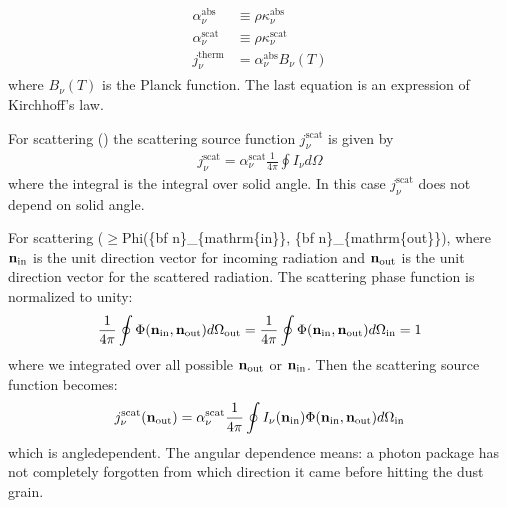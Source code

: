 \documentclass[letterpaper,10pt,english]{sphinxmanual}
\begin{document}
\label{\detokenize{dustradtrans:eq-thermal-source-function}}\begin{equation*}
\begin{split}\begin{split}
\alpha_\nu^{\mathrm{abs}} &\equiv \rho\kappa_\nu^{\mathrm{abs}}\\
\alpha_\nu^{\mathrm{scat}} &\equiv \rho\kappa_\nu^{\mathrm{scat}}\\
j_\nu^{\mathrm{therm}} &= \alpha_\nu^{\mathrm{abs}} B_\nu(T)
\end{split}\end{split}
\end{equation*}
where \(B_\nu(T)\) is the Planck function. The last equation is an
expression of Kirchhoff’s law.

For  scattering () the
scattering source function \(j_\nu^{\mathrm{scat}}\) is given by
\begin{equation*}
\begin{split}j_\nu^{\mathrm{scat}} = \alpha_\nu^{\mathrm{scat}} \frac{1}{4\pi}\oint I_\nu d\Omega\end{split}
\end{equation*}
where the integral is the integral over solid angle. In this case
\(j_\nu^{\mathrm{scat}}\) does not depend on solid angle.

For  scattering (\(\ge\)Phi(\{bf n\}\_\{mathrm\{in\}\},
\{bf n\}\_\{mathrm\{out\}\})\textasciigrave{}, where
\({\bf n}_{\mathrm{in}}\) is the unit direction vector for incoming radiation
and \({\bf n}_{\mathrm{out}}\) is the unit direction vector for the scattered
radiation. The
scattering phase function is normalized to unity:
\begin{equation*}
\begin{split}\frac{1}{4\pi}\oint\Phi({\bf n}_{\mathrm{in}},
{\bf n}_{\mathrm{out}}) d\Omega_{\mathrm{out}}
=\frac{1}{4\pi}\oint\Phi({\bf n}_{\mathrm{in}},
{\bf n}_{\mathrm{out}}) d\Omega_{\mathrm{in}}=1\end{split}
\end{equation*}
where we integrated over all possible \({\bf n}_{\mathrm{out}}\) or
\({\bf n}_{\mathrm{in}}\).
Then the scattering source function becomes:
\begin{equation*}
\begin{split}\begin{split}
j_\nu^{\mathrm{scat}}({\bf n}_{\mathrm{out}}) =
\alpha_\nu^{\mathrm{scat}} \frac{1}{4\pi}\oint I_\nu({\bf n}_{\mathrm{in}})
\Phi({\bf n}_{\mathrm{in}},{\bf n}_{\mathrm{out}}) d\Omega_{\mathrm{in}}
\end{split}\end{split}
\end{equation*}
which is angle\sphinxhyphen{}dependent. The angular dependence means: a photon package has not
completely forgotten from which direction it came before hitting the dust grain.
\end{document}
